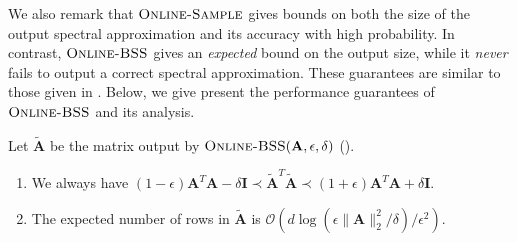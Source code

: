 \documentclass{toc}
\newcommand{\Oh}{\ensuremath{\mathcal{O}}}
\newcommand{\bv}[1]{\mathbf{#1}}
\newcommand{\norm}[1]{\|#1\|}
\begin{document}
We also remark that $\textsc{Online-Sample}$  gives bounds on both the size of the output spectral approximation and its accuracy with high probability.  In contrast, $\textsc{Online-BSS}$ gives an \emph{expected} bound on the output size, while it \emph{never} fails to output a correct spectral approximation.  These guarantees are similar to those given in  \cite{lee2015linear}.
%
%
%
%
%
Below, we give present the performance  guarantees of $\textsc{Online-BSS}$ and its analysis.
\begin{theorem}
\leavevmode
\label{thm:bss}
 Let  $\bv{\tilde{A}}$ be the matrix output by  $\textsc{Online-BSS}(\bv{A},\epsilon,\delta)$ ().
\begin{enumerate}
\item We always have %
$
(1-\epsilon) \bv{A}^T \bv{A} - \delta \bv{I} \prec \bv{\tilde{A}}^T \bv{\tilde{A}} \prec (1+\epsilon) \bv{A}^T \bv{A} + \delta \bv{I}.
$

\item
The expected number of rows in $\bv{\tilde{A}}$ is $\Oh(d \log (\epsilon\norm{\bv A}_2^2/\delta) / \epsilon^2)$.
\end{enumerate}
\end{theorem}
\end{document}
